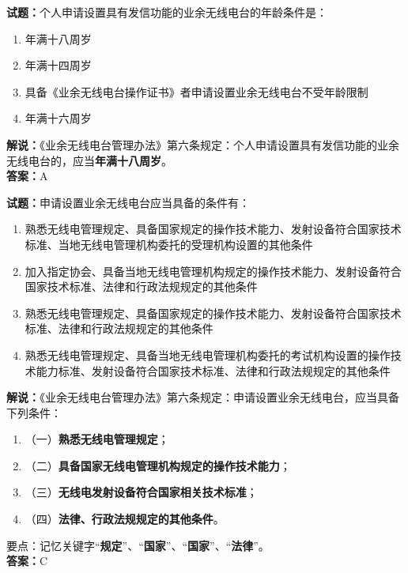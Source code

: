 \documentclass{ctexbook}
\begin{document}
\vspace{\baselineskip}

\noindent\textbf{试题：}个人申请设置具有发信功能的业余无线电台的年龄条件是：
\begin{enumerate}[leftmargin=3em]
  \item 年满十八周岁
  \item 年满十四周岁
  \item 具备《业余无线电台操作证书》者申请设置业余无线电台不受年龄限制
  \item 年满十六周岁
\end{enumerate}
\noindent\textbf{解说：}《业余无线电台管理办法》第六条规定：个人申请设置具有发信功能的业余无线电台的，应当\textbf{年满十八周岁}。\\\noindent\textbf{答案：}A

\vspace{\baselineskip}

\noindent\textbf{试题：}申请设置业余无线电台应当具备的条件有：
\begin{enumerate}[leftmargin=3em]
  \item 熟悉无线电管理规定、具备国家规定的操作技术能力、发射设备符合国家技术标准、当地无线电管理机构委托的受理机构设置的其他条件
  \item 加入指定协会、具备当地无线电管理机构规定的操作技术能力、发射设备符合国家技术标准、法律和行政法规规定的其他条件
  \item 熟悉无线电管理规定、具备国家规定的操作技术能力、发射设备符合国家技术标准、法律和行政法规规定的其他条件
  \item 熟悉无线电管理规定、具备当地无线电管理机构委托的考试机构设置的操作技术能力标准、发射设备符合国家技术标准、法律和行政法规规定的其他条件
\end{enumerate}
\noindent\textbf{解说：}《业余无线电台管理办法》第六条规定：申请设置业余无线电台，应当具备下列条件：
\begin{enumerate}[label=, leftmargin=0.8em]
  \item （一）\textbf{熟悉无线电管理规定}；
  \item （二）\textbf{具备国家无线电管理机构规定的操作技术能力}；
  \item （三）\textbf{无线电发射设备符合国家相关技术标准}；
  \item （四）\textbf{法律、行政法规规定的其他条件}。
\end{enumerate}
要点：记忆关键字“\textbf{规定}”、“\textbf{国家}”、“\textbf{国家}”、“\textbf{法律}”。\\\noindent\textbf{答案：}C
\end{document}
